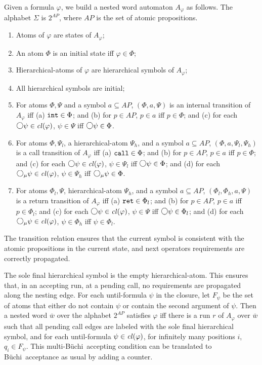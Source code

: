 \documentclass{LMCS}
\newcommand{\M}{{\mu}}
\newcommand{\w}{{\bar{w}}}
\newcommand{\dm}{\Diamond}
\newcommand{\next}{\text{\raisebox{1pt}{$\bigcirc$}}}
\theoremstyle{plain}
\theoremstyle{definition}
\newcommand{\retr}{\mathit{ret}}
\renewcommand{\int}{\intt}
\newcommand{\AP}{\mathit{AP}}
\def\Cl{{\it cl\/}}
\def\buchi{B\"{u}chi}
\newcommand{\intt}{{\tt int}}
\newcommand{\rett}{{\tt ret}}
\newcommand{\call}{{\tt call}}
\renewcommand{\retr}{\rett}
\newcommand{\dmm}{\dm_{\M}}
\renewcommand{\dm}{\next}
\renewcommand{\dmm}{\dm_\M}
\begin{document}
Given a formula $\varphi$, we build a nested word automaton $A_\varphi$ as follows.
The alphabet $\Sigma$ is $2^\AP$, where $AP$ is the set of atomic
propositions. 
\begin{enumerate}[(1)]
\item
Atoms of $\varphi$ are states of $A_\varphi$;
\item
An atom $\Phi$ is an initial state iff $\varphi\in\Phi$;
\item
Hierarchical-atoms of $\varphi$ are hierarchical symbols of $A_\varphi$;
\item
All hierarchical symbols are initial;
\item
For atoms $\Phi,\Psi$ and a symbol $a\subseteq \AP$,
$(\Phi,a,\Psi)$ is an internal transition of $A_\varphi$ iff
(a) $\int\in\Phi$; and
(b) for $p\in\AP$, $p\in a$ iff $p\in\Phi$; and
(c) for each $\next\psi\in\Cl(\varphi)$,
$\psi\in\Psi$ iff $\next\psi\in\Phi$.
\item
For atoms $\Phi,\Psi_l$, a hierarchical-atom $\Psi_h$, and a symbol $a\subseteq \AP$,
$(\Phi,a,\Psi_l,\Psi_h)$ is a call transition of $A_\varphi$ iff
(a) $\call\in\Phi$; and
(b) for $p\in\AP$, $p\in a$ iff $p\in\Phi$; and
(c) for each $\next\psi\in\Cl(\varphi)$,
$\psi\in\Psi_l$ iff $\next\psi\in\Phi$; and
(d) for each $\dmm\psi\in\Cl(\varphi)$,
$\psi\in\Psi_h$ iff $\dmm\psi\in\Phi$.
\item
For atoms $\Phi_l,\Psi$, hierarchical-atom $\Psi_h$, and a symbol $a\subseteq \AP$,
$(\Phi_l,\Phi_h,a,\Psi)$ is a return transition of $A_\varphi$ iff
(a) $\retr\in\Phi_l$; and
(b) for $p\in\AP$, $p\in a$ iff $p\in\Phi_l$; and
(c) for each $\next\psi\in\Cl(\varphi)$,
$\psi\in\Psi$ iff $\next\psi\in\Phi_l$; and
(d) for each $\dmm\psi\in\Cl(\varphi)$,
$\psi\in\Phi_h$ iff $\psi\in\Phi_l$.

\end{enumerate}
The transition relation ensures that the current symbol is consistent
with the atomic propositions in the current state, and next operators
requirements are correctly propagated.

The sole final  hierarchical symbol is the empty hierarchical-atom.
This ensures that, in an accepting run,
at a pending call, no requirements are propagated along the nesting edge.
For each until-formula $\psi$ in the closure, let $F_\psi$ be the set
of atoms that either do not contain $\psi$ or contain the second argument of $\psi$.
Then a nested word $\w$ over the alphabet $2^\AP$ satisfies  $\varphi$ iff
there is a run $r$ of $A_\varphi$ over $\w$ such that 
all pending call edges are labeled with the sole final hierarchical symbol, and
for each until-formula $\psi\in\Cl(\varphi)$, for infinitely many positions $i$,
$q_i\in F_\psi$. 
This multi-\buchi\ accepting condition  can
be translated to \buchi\ acceptance as usual by adding a counter.
\end{document}
